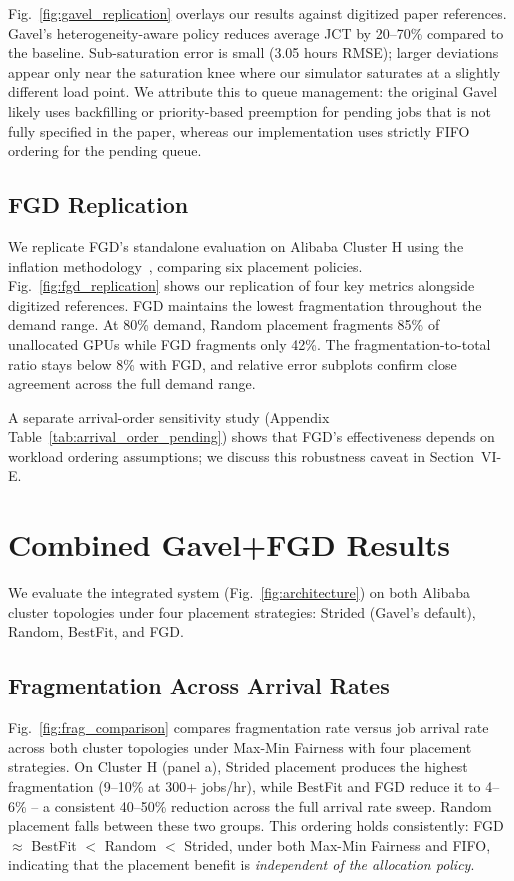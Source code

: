 \documentclass[conference]{IEEEtran}
\begin{document}
Fig.~\ref{fig:gavel_replication} overlays our results against digitized paper references.
Gavel's heterogeneity-aware policy reduces average JCT by 20--70\% compared to the baseline.
Sub-saturation error is small (3.05 hours RMSE); larger deviations appear only near the saturation knee where our simulator saturates at a slightly different load point.
We attribute this to queue management: the original Gavel likely uses backfilling or priority-based preemption for pending jobs that is not fully specified in the paper, whereas our implementation uses strictly FIFO ordering for the pending queue.

\subsection{FGD Replication}
We replicate FGD's standalone evaluation on Alibaba Cluster H using the inflation methodology~\cite{FGD}, comparing six placement policies.
Fig.~\ref{fig:fgd_replication} shows our replication of four key metrics alongside digitized references.
FGD maintains the lowest fragmentation throughout the demand range.
At 80\% demand, Random placement fragments 85\% of unallocated GPUs while FGD fragments only 42\%.
The fragmentation-to-total ratio stays below 8\% with FGD, and relative error subplots confirm close agreement across the full demand range.

A separate arrival-order sensitivity study (Appendix Table~\ref{tab:arrival_order_pending}) shows that FGD's effectiveness depends on workload ordering assumptions; we discuss this robustness caveat in Section~VI-E.


\section{Combined Gavel+FGD Results}

We evaluate the integrated system (Fig.~\ref{fig:architecture}) on both Alibaba cluster topologies under four placement strategies: Strided (Gavel's default), Random, BestFit, and FGD.

\subsection{Fragmentation Across Arrival Rates}
Fig.~\ref{fig:frag_comparison} compares fragmentation rate versus job arrival rate across both cluster topologies under Max-Min Fairness with four placement strategies.
On Cluster H (panel a), Strided placement produces the highest fragmentation (9--10\% at 300+ jobs/hr), while BestFit and FGD reduce it to 4--6\% -- a consistent 40--50\% reduction across the full arrival rate sweep.
Random placement falls between these two groups.
This ordering holds consistently: FGD $\approx$ BestFit $<$ Random $<$ Strided, under both Max-Min Fairness and FIFO, indicating that the placement benefit is \textit{independent of the allocation policy}.
\end{document}
